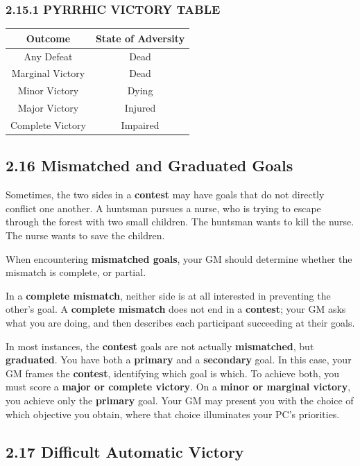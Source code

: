 \documentclass[
]{article}
\begin{document}
\hypertarget{pyrrhic-victory-table}{%
\subsubsection{2.15.1 PYRRHIC VICTORY
TABLE}\label{pyrrhic-victory-table}}

\begin{longtable}[]{@{}cc@{}}
\toprule
Outcome & State of Adversity\tabularnewline
\midrule
\endhead
Any Defeat & Dead\tabularnewline
Marginal Victory & Dead\tabularnewline
Minor Victory & Dying\tabularnewline
Major Victory & Injured\tabularnewline
Complete Victory & Impaired\tabularnewline
\bottomrule
\end{longtable}

\hypertarget{mismatched-and-graduated-goals}{%
\subsection{2.16 Mismatched and Graduated
Goals}\label{mismatched-and-graduated-goals}}

Sometimes, the two sides in a \textbf{contest} may have goals that do
not directly conflict one another. A huntsman pursues a nurse, who is
trying to escape through the forest with two small children. The
huntsman wants to kill the nurse. The nurse wants to save the children.

When encountering \textbf{mismatched goals}, your GM should determine
whether the mismatch is complete, or partial.

In a \textbf{complete mismatch}, neither side is at all interested in
preventing the other's goal. A \textbf{complete mismatch} does not end
in a \textbf{contest}; your GM asks what you are doing, and then
describes each participant succeeding at their goals.

In most instances, the \textbf{contest} goals are not actually
\textbf{mismatched}, but \textbf{graduated}. You have both a
\textbf{primary} and a \textbf{secondary} goal. In this case, your GM
frames the \textbf{contest}, identifying which goal is which. To achieve
both, you must score a \textbf{major or complete victory}. On a
\textbf{minor or marginal victory}, you achieve only the
\textbf{primary} goal. Your GM may present you with the choice of which
objective you obtain, where that choice illuminates your PC's
priorities.

\hypertarget{difficult-automatic-victory}{%
\subsection{2.17 Difficult Automatic
Victory}\label{difficult-automatic-victory}}
\end{document}

